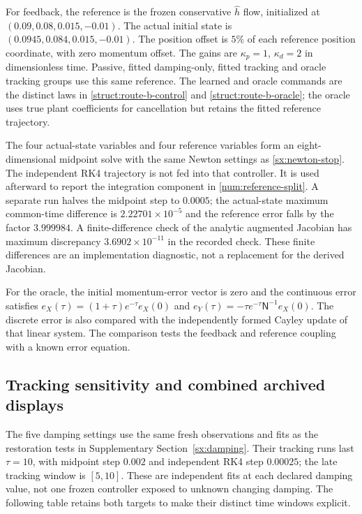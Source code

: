 For feedback, the reference is the frozen conservative $\widehat h$
flow, initialized at $(0.09,0.08,0.015,-0.01)$.
The actual initial state is $(0.0945,0.084,0.015,-0.01)$.
The position offset is $5\%$ of each reference position coordinate,
with zero momentum offset. The gains are $\kappa_p=1$, $\kappa_d=2$ in
dimensionless time. Passive, fitted damping-only, fitted tracking
and oracle tracking groups use this same reference. The learned
and oracle commands are the distinct laws in
\eqref{struct:route-b-control} and \eqref{struct:route-b-oracle}; the oracle uses true plant coefficients
for cancellation but retains the fitted reference trajectory.

The four actual-state variables and four reference variables form an
eight-dimensional midpoint solve with the same Newton settings as
\eqref{sx:newton-stop}. The independent RK4 trajectory is not fed into
that controller. It is used afterward to report the integration
component in \eqref{num:reference-split}.
A separate run halves the midpoint step to $0.0005$; the actual-state
maximum common-time difference is $2.22701\times10^{-5}$ and the
reference error falls by the factor $3.999984$.
A finite-difference check of the analytic augmented Jacobian has
maximum discrepancy $3.6902\times10^{-11}$ in the recorded check.
These finite differences are an implementation diagnostic, not a
replacement for the derived Jacobian.

For the oracle, the initial momentum-error vector is zero and the
continuous error satisfies
$e_X(\tau)=(1+\tau)e^{-\tau}e_X(0)$ and
$e_Y(\tau)=-\tau e^{-\tau}\mathsf N^{-1}e_X(0)$.
The discrete error is also compared with the independently formed
Cayley update of that linear system. The comparison tests the
feedback and reference coupling with a known error equation.


\subsection{Tracking sensitivity and combined archived displays}
\label{xtr:shared-results}
The five damping settings use the same fresh observations and fits as the
restoration tests in Supplementary Section~\ref{sx:damping}. Their tracking
runs last $\tau=10$, with midpoint step $0.002$ and independent RK4 step
$0.00025$; the late tracking window is $[5,10]$. These are independent fits
at each declared damping value, not one frozen controller exposed to
unknown changing damping. The following table retains both targets to
make their distinct time windows explicit.

